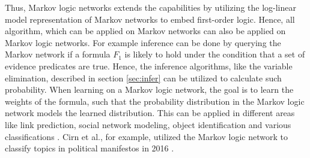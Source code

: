 Thus, Markov logic networks extends the capabilities by utilizing the log-linear model representation of Markov networks to embed first-order logic. Hence, all algorithm, which can be applied on Markov networks can also be applied on Markov logic networks. For example inference can be done by querying the Markov network if a formula $F_1$ is likely to hold under the condition that a set of evidence predicates are true. Hence, the inference algorithms, like the variable elimination, described in section \ref{sec:infer} can be utilized to calculate such probability. When learning on a Markov logic network, the goal is to learn the weights of the formula, such that the probability distribution in the Markov logic network models the learned distribution. This can be applied in different areas like link prediction, social network modeling, object identification and various classifications \cite{richardson2006markov}. Cirn et al., for example, utilized the Markov logic network to classify topics in political manifestos in 2016 \cite{zirn2016classifying}.


